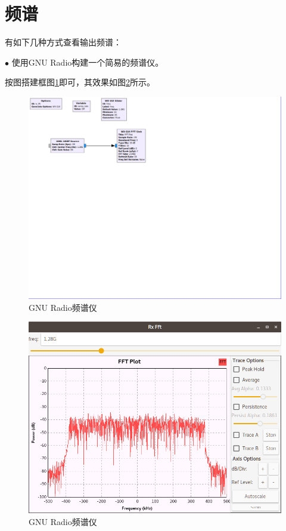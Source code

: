 	\section{频谱}
		\par 有如下几种方式查看输出频谱：
		\par $\bullet$ 使用GNU Radio构建一个简易的频谱仪。
		\par 按图搭建框图\ref{fig:dvbt_rx_fft}即可，其效果如图\ref{fig:dvbt_rx_fft_1}所示。
		\begin{figure}[htp]
			\centering
			\includegraphics[width=13cm]{figures/dvbt_rx_fft.png}
			\caption{GNU Radio频谱仪}
			\label{fig:dvbt_rx_fft}
		\end{figure}
		\begin{figure}[htp]
			\centering
			\includegraphics[width=13cm]{figures/dvbt_rx_fft_1.png}
			\caption{GNU Radio频谱仪}
			\label{fig:dvbt_rx_fft_1}
		\end{figure}
